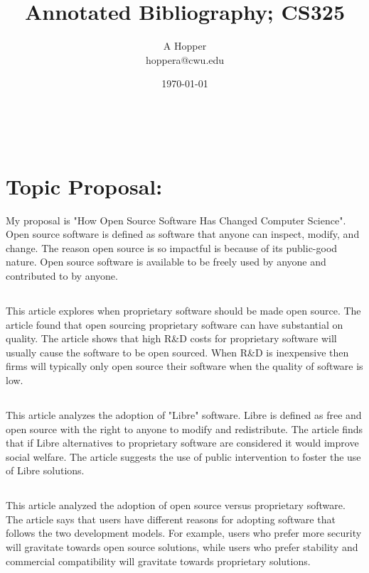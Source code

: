 \documentclass[12pt,letterpaper]{article}
\title{Annotated Bibliography; CS325}
\author{A Hopper \\ hoppera@cwu.edu}
\date{\today}
\makeatletter
\renewcommand{\maketitle}{\bgroup
   \begin{center}
   \textbf{{\fontsize{18pt}{20}\selectfont \@title}}\\
   \vspace{10pt}
   {\fontsize{12pt}{0}\selectfont \@author} 
   \end{center}
}
\makeatother
\begin{document}
\maketitle
\thispagestyle{fancy}

\section*{Topic Proposal: }
My proposal is "How Open Source Software Has Changed Computer Science". Open source software is defined as software that anyone can inspect, modify, and change. The reason open source is so impactful is because of its public-good nature. Open source software is available to be freely used by anyone and contributed to by anyone. 


\subsection*{}
This article explores when proprietary software should be made open source. The article found that open sourcing proprietary software can have substantial on quality. The article shows that high R&D costs for proprietary software will usually cause the software to be open sourced. When R&D is inexpensive then firms will typically only open source their software when the quality of software is low.


\subsection*{}
This article analyzes the adoption of "Libre" software. Libre is defined as free and open source with the right to anyone to modify and redistribute. The article finds that if Libre alternatives to proprietary software are considered it would improve social welfare. The article suggests the use of public intervention to foster the use of Libre solutions.

\subsection*{}
This article analyzed the adoption of open source versus proprietary software. The article says that users have different reasons for adopting software that follows the two development models. For example, users who prefer more security will gravitate towards open source solutions, while users who prefer stability and commercial compatibility will gravitate towards proprietary solutions. 
\end{document}
